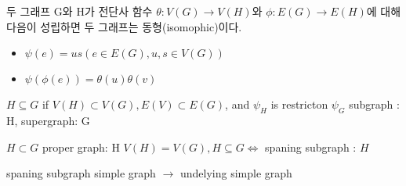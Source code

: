 \documentclass{oblivoir}
\begin{document}
\begin{thm}[isomophic] 두 그래프 G와 H가  전단사 함수 $\theta : V(G) \longrightarrow V(H)$와 $\phi : E(G) \rightarrow E(H)$에 대해 다음이 성립하면 두 그래프는 동형(isomophic)이다.
\begin{itemize}
    \item $\psi(e) = us( e \in E(G), u,s \in V(G)) $
    \item $\psi(\phi(e)) = \theta(u)\theta(v)$%
\end{itemize}
\end{thm}

  $H \subseteq G$ if $ V(H) \subset V(G), E(V) \subset E(G)$, and $\psi_{H}$ is restricton $\psi_{G}$
    subgraph : H, supergraph: G

    $ H \subset G$ proper graph: H
    $V(H) = V(G) , H \subseteq G \Longleftrightarrow$ spaning subgraph : $H$

    spaning subgraph  simple graph $\rightarrow$ undelying simple graph
\end{document}
